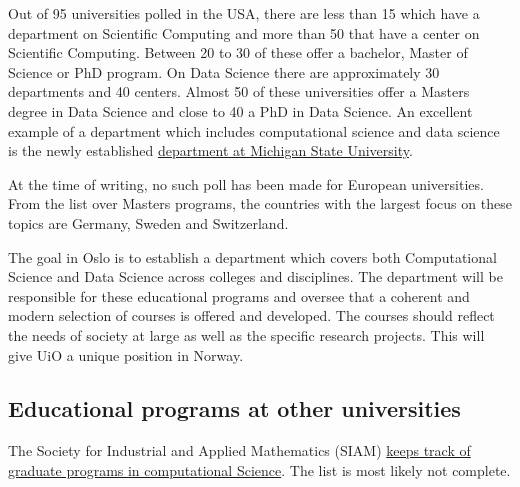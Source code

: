 \documentclass[%
oneside,                 %
final,                   %
10pt]{article}
\begin{document}
\noindent
Out of 95 universities polled in the USA, there are less than 15 which have a department on Scientific Computing
and more than 50 that have a center on Scientific Computing. Between 20 to 30 of these offer a bachelor, Master of Science or PhD program. On Data Science there are approximately 30 departments and 40 centers. Almost 50 of these universities offer a Masters degree in Data Science and close to 40 a PhD in Data Science. 
An excellent example of a department which includes computational science and data science is the newly established \href{{https://cmse.msu.edu/}}{department at Michigan State University}.

At the time of writing, no such poll has been made for European universities. From the list over Masters programs, the countries with the largest focus on these topics are Germany, Sweden and Switzerland. 

The goal in Oslo is to establish a department which covers both Computational Science and Data Science across colleges and disciplines. The department will be responsible for these educational programs and oversee that a coherent and modern selection of courses is offered and developed. The courses should reflect the needs of society at large as well as the specific research projects.  This will give UiO a unique position in Norway. 


\subsection*{Educational programs at  other universities}

The Society for Industrial and Applied Mathematics (SIAM) \href{{https://www.siam.org/students/resources/cse_programs.php}}{keeps track of graduate programs in computational Science}. The list is most likely not complete. 



\end{document}
